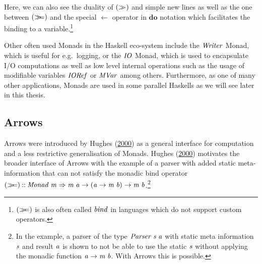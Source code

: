 \documentclass[paper=A4,twoside=true,openright,parskip=full,chapterprefix=true,headings=normal,bibliography=totoc,listof=totoc,titlepage=on,captions=tableabove,draft=false,british]{scrreprt}%
\begin{document}
Here, we can also see the duality of \ensuremath{(\sequ )} and simple new lines as well
as the one between \ensuremath{(\bind )} and the special \ensuremath{\leftarrow } operator in \ensuremath{\mathbf{do}}
notation which facilitates the binding to a variable.\footnote{\ensuremath{(\bind )}
  is also often called \ensuremath{\Varid{bind}} in languages which do not support custom
  operators.}

Other often used Monads in the Haskell eco-system include the \ensuremath{\Conid{Writer}}
Monad, which is useful for e.g.~logging, or the \ensuremath{\Conid{IO}} Monad, which is
used to encapsulate I/O computations as well as low level internal
operations such as the usage of modifiable variables \ensuremath{\Conid{IORef}} or \ensuremath{\Conid{MVar}}
among others. Furthermore, as one of many other applications, Monads are
used in some parallel Haskells as we will see later in this thesis.

\hypertarget{arrows-1}{%
\subsection{Arrows}\label{arrows-1}}

\label{sec:arrows}

Arrows were introduced by Hughes
(\protect\hyperlink{ref-HughesArrows}{2000}) as a general interface for
computation and a less restrictive generalisation of Monads. Hughes
(\protect\hyperlink{ref-HughesArrows}{2000}) motivates the broader
interface of Arrows with the example of a parser with added static
meta-information that can not satisfy the monadic bind operator
\ensuremath{(\bind )\mathbin{::}\Conid{Monad}\;\Varid{m}\Rightarrow \Varid{m}\;\Varid{a}\to (\Varid{a}\to \Varid{m}\;\Varid{b})\to \Varid{m}\;\Varid{b}}.\footnote{In the example,
  a parser of the type \ensuremath{\Conid{Parser}\;\Varid{s}\;\Varid{a}} with static meta information \ensuremath{\Varid{s}} and
  result \ensuremath{\Varid{a}} is shown to not be able to use the static \ensuremath{\Varid{s}} without
  applying the monadic function \ensuremath{\Varid{a}\to \Varid{m}\;\Varid{b}}. With Arrows this is
  possible.}
\end{document}
